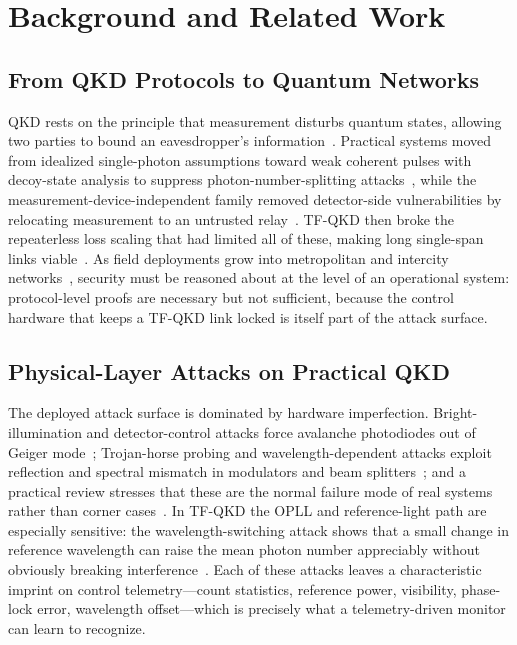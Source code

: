 \documentclass[runningheads]{llncs}
\begin{document}
\section{Background and Related Work}
\subsection{From QKD Protocols to Quantum Networks}
QKD rests on the principle that measurement disturbs quantum states, allowing two parties to bound an eavesdropper's information~\cite{bb84}. Practical systems moved from idealized single-photon assumptions toward weak coherent pulses with decoy-state analysis to suppress photon-number-splitting attacks~\cite{pns,hwang,lo2005}, while the measurement-device-independent family removed detector-side vulnerabilities by relocating measurement to an untrusted relay~\cite{mdi}. TF-QKD then broke the repeaterless loss scaling that had limited all of these, making long single-span links viable~\cite{tfqkd}. As field deployments grow into metropolitan and intercity networks~\cite{chen2021integrated,wehner2018internet,pirandola2020advances}, security must be reasoned about at the level of an operational system: protocol-level proofs are necessary but not sufficient, because the control hardware that keeps a TF-QKD link locked is itself part of the attack surface.

\subsection{Physical-Layer Attacks on Practical QKD}
The deployed attack surface is dominated by hardware imperfection. Bright-illumination and detector-control attacks force avalanche photodiodes out of Geiger mode~\cite{lydersen,makarov}; Trojan-horse probing and wavelength-dependent attacks exploit reflection and spectral mismatch in modulators and beam splitters~\cite{gisin,li2011}; and a practical review stresses that these are the normal failure mode of real systems rather than corner cases~\cite{jain}. In TF-QKD the OPLL and reference-light path are especially sensitive: the wavelength-switching attack shows that a small change in reference wavelength can raise the mean photon number appreciably without obviously breaking interference~\cite{peng}. Each of these attacks leaves a characteristic imprint on control telemetry---count statistics, reference power, visibility, phase-lock error, wavelength offset---which is precisely what a telemetry-driven monitor can learn to recognize.
\end{document}
